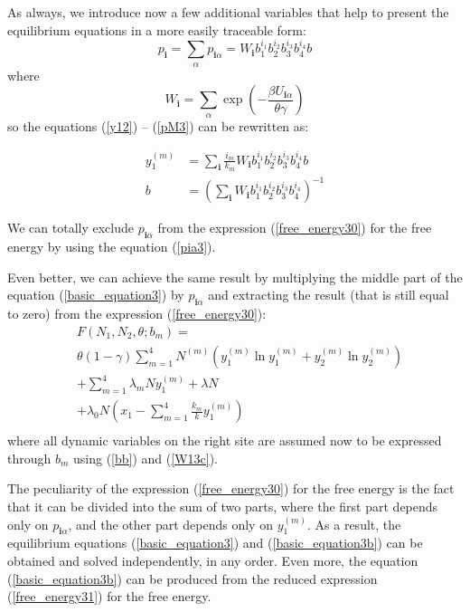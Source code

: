 \documentclass[12pt,abstract]{scrartcl}
\begin{document}
As always, we introduce now a few additional variables that  help to present the equilibrium equations in a more easily traceable form:
\begin{equation} \label{pi3}
    p_{\mathbf{i}} = \sum_\alpha p_{\mathbf{i} \alpha} = W_{\mathbf{i}} b_1^{i_1} b_2^{i_2} b_3^{i_3} b_4^{i_4} b
\end{equation}
where
\begin{equation} \label{Wi3}
    W_{\mathbf{i}} = \sum_\alpha  \exp \left(- \frac{ \beta U_{\mathbf{i}  \alpha} }{\theta\gamma }\right) 
\end{equation}
so the equations (\ref{y12}) -- (\ref{pM3}) can be rewritten as:

\begin{equation} \label{W13c}
\begin{split}
y_1^{(m)} &= \sum_{\mathbf{i} } \frac{i_m}{k_m} W_{\mathbf{i}}   b_1^{i_1} b_2^{i_2} b_3^{i_3} b_4^{i_4} b\\
b &=  \left( \sum_{\mathbf{i} } W_{\mathbf{i} }   b_1^{i_1} b_2^{i_2} b_3^{i_3} b_4^{i_4}\right) ^{-1}
\end{split}
\end{equation}

We can totally exclude $p_{\mathbf{i}  \alpha}$ from the expression (\ref{free_energy30}) for the free energy by using the  equation (\ref{pia3}).

Even better, we can achieve the same result by 
multiplying the middle part of the equation (\ref{basic_equation3}) by $p_{\mathbf{i} \alpha}$ and extracting the result (that is still equal to zero) from the expression (\ref{free_energy30}):
\begin{equation} \label{free_energy31}
\begin{split}
&F(N_1, N_2, \theta; b_m)= \\
& \theta(1- \gamma) \sum_{m = 1}^4  N^{(m)} ( y_1^{(m)} \ln y_1^{(m)} + y_2^{(m)} \ln y_2^{(m)} )\\
&+ \sum_{m=1}^4 \lambda_m Ny_1^{(m)} 
+ \lambda N \\
&+ \lambda_0 N \left(x_1 - \sum_{m=1}^4 \frac{k_m}{k} y_1^{(m)} \right)
\\
\end{split}
\end{equation}
where all dynamic variables on the right site are assumed now to be expressed through $b_m$ using (\ref{bb}) and (\ref{W13c}).

The peculiarity of the expression (\ref{free_energy30}) for the free energy is the fact that it can be divided into the sum of two parts, where the first part depends only on  $p_{\mathbf{i} \alpha}$, and the other part depends only on $y_1^{(m)}$.
As a result, the equilibrium equations (\ref{basic_equation3}) and (\ref{basic_equation3b}) can be obtained  and solved independently, in any order.
Even more, the equation (\ref{basic_equation3b}) can be produced from the reduced expression (\ref{free_energy31}) for the free energy.
\end{document}
